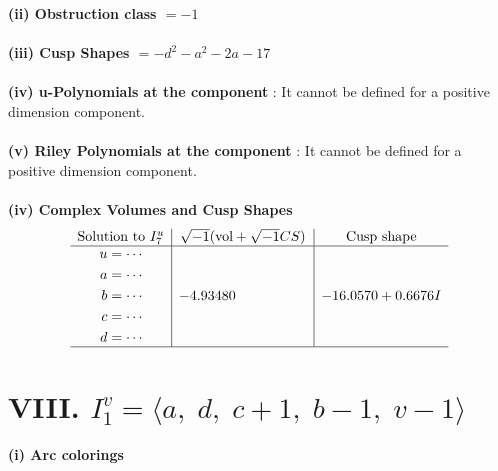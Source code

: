 \documentclass[1p]{elsarticle_modified}
\theoremstyle{definition}
\newcommand{\I}{\sqrt{-1}}
\begin{document}
\flushleft \textbf{(ii) Obstruction class $= -1$}\\~\\
\flushleft \textbf{(iii) Cusp Shapes $= - d^2- a^2-2 a-17$}\\~\\
\flushleft \textbf{(iv) u-Polynomials at the component} : It cannot be defined for a positive dimension component.\\~\\
\flushleft \textbf{(v) Riley Polynomials at the component} : It cannot be defined for a positive dimension component.\\~\\
\newpage\flushleft \textbf{(iv) Complex Volumes and Cusp Shapes}
$$\begin{array}{c|c|c} 
\text{Solution to }I^u_{7}& \I (\text{vol} + \sqrt{-1}CS) & \text{Cusp shape}\\
 \hline 
\begin{aligned}
u &= \cdots \\
a &= \cdots \\
b &= \cdots \\
c &= \cdots \\
d &= \cdots\end{aligned}
 & -4.93480\phantom{ +0.000000I} & -16.0570 + 0.6676 I\\
 \hline 
 \end{array}
$$\newpage\renewcommand{\arraystretch}{1}
\centering \section*{VIII. $I^v_{1}= \langle a,\;d,\;c+1,\;b-1,\;v-1 \rangle$}
\flushleft \textbf{(i) Arc colorings}\\
\end{document}
